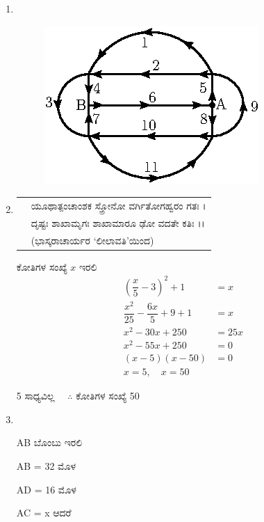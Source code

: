 \begin{enumerate}
\begin{minipage}[c]{4cm}
\begin{figure}[H]
\end{figure}
\end{minipage}

\item
~

\begin{figure}[H]
\centering
\includegraphics[scale=1.4]{images/chap5/ans20.eps}

\end{figure}


\item
\begin{tabular}[t]{rl}
& ಯೂಥಾತ್ಪಂಚಾಂಶಕ ಸ್ತ್ರೋನೋ ವರ್ಗಿತೋಗಹ್ವರಂ ಗತಃ ।\\
& ದೃಷ್ಟಃ ಶಾಖಾಮೃಗಃ ಶಾಖಾಮಾರೂ ಢೋ ವದತೇ ಕತಿಃ ।। \\[0.1cm]
& \qquad \hfill{(ಭಾಸ್ಕರಾಚಾರ್ಯರ `ಲೀಲಾವತಿ'ಯಿಂದ)}
\end{tabular}

ಕೋತಿಗಳ ಸಂಖ್ಯೆ $x$ ಇರಲಿ
\begin{align*}
\left(\dfrac{x}{5} - 3 \right)^{2} + 1 & = x\\
\dfrac{x^{2}}{25} - \dfrac{6x}{5} + 9 + 1 & = x\\
x^{2} - 30x + 250 & = 25x\\
x^{2} - 55x + 250 & = 0\\
(x - 5)(x - 50) & = 0\\
x = 5,\quad x = 50 &
\end{align*}

5 ಸಾಧ್ಯವಿಲ್ಲ $\quad\therefore$ ಕೋತಿಗಳ ಸಂಖ್ಯೆ  50

\item
~

\begin{minipage}[c]{4cm}
AB ಬೊಂಬು ಇರಲಿ 

AB = 32 ಮೊಳ 

AD = 16 ಮೊಳ 

AC = x ಆದರೆ


\end{minipage}
\end{enumerate}
